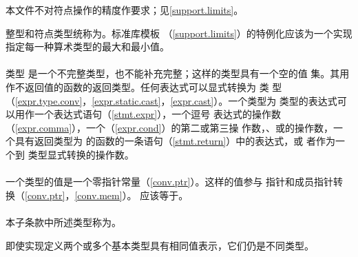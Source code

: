 \begin{note}
  本文件不对符点操作的精度作要求；见\ref{support.limits}。
\end{note}

整型和符点类型统称为。标准库模板
（\ref{support.limits}）的特例化应该为一个实现指定每一种算术类型的最大和最小值。

\paragraph{} %
类型 是一个不完整类型，也不能补充完整；这样的类型具有一个空的值
集。其用作不返回值的函数的返回类型。任何表达式可以显式转换为 类
型（\ref{expr.type.conv}，\ref{expr.static.cast}，\ref{expr.cast}）。一个类型为
 类型的表达式可以用作一个表达式语句（\ref{stmt.expr}），一个逗号
表达式的操作数（\ref{expr.comma}），一个（\ref{expr.cond}）的第二或第三操
作数，、或的操作数，一个具有返回类型为
 的函数的一条语句（\ref{stmt.return}）中的表达式，或
者作为一个到 类型显式转换的操作数。

\paragraph{} %
一个类型的值是一个零指针常量（\ref{conv.ptr}）。这样的值参与
指针和成员指针转换（\ref{conv.ptr}，\ref{conv.mem}）。
应该等于。

\paragraph{} %
本子条款中所述类型称为。

\begin{note}
  即使实现定义两个或多个基本类型具有相同值表示，它们仍是不同类型。
\end{note}
